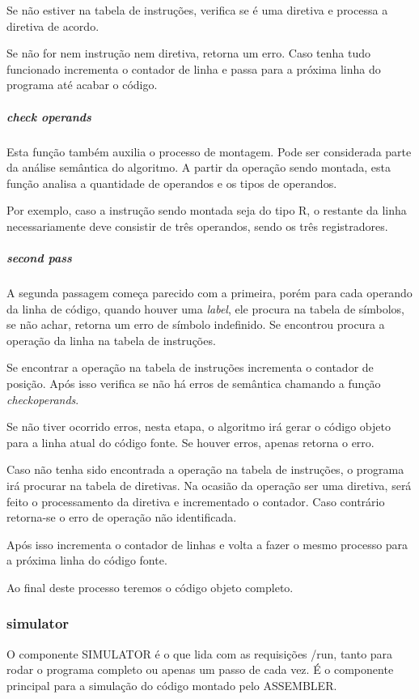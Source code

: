 				Se não estiver na tabela de instruções, verifica se é uma diretiva e processa a diretiva de acordo.

				Se não for nem instrução nem diretiva, retorna um erro. Caso tenha tudo funcionado incrementa o contador de linha e passa para a próxima linha do programa até acabar o código.

			\subparagraph{check operands}

				Esta função também auxilia o processo de montagem. Pode ser considerada parte da análise semântica do algoritmo. A partir da operação sendo montada, esta função analisa a quantidade de operandos e os tipos de operandos. 

				Por exemplo, caso a instrução sendo montada seja do tipo R, o restante da linha necessariamente deve consistir de três operandos, sendo os três registradores. 

			\subparagraph{second pass}
			
				A segunda passagem começa parecido com a primeira, porém para cada operando da linha de código, quando houver uma \textit{label}, ele procura na tabela de símbolos, se não achar, retorna um erro de símbolo indefinido. Se encontrou procura a operação da linha na tabela de instruções.

				Se encontrar a operação na tabela de instruções incrementa o contador de posição. Após isso verifica se não há erros de semântica chamando a função \textit{check\textunderscore operands}.

				Se não tiver ocorrido erros, nesta etapa, o algoritmo irá gerar o código objeto para a linha atual do código fonte. Se houver erros, apenas retorna o erro.

				Caso não tenha sido encontrada a operação na tabela de instruções, o programa irá procurar na tabela de diretivas. Na ocasião da operação ser uma diretiva, será feito o processamento da diretiva e incrementado o contador. Caso contrário retorna-se o erro de operação não identificada.

				Após isso incrementa o contador de linhas e volta a fazer o mesmo processo para a próxima linha do código fonte.

				Ao final deste processo teremos o código objeto completo.
			
		\subsubsection{simulator}

			O componente SIMULATOR é o que lida com as requisições /run, tanto para rodar o programa completo ou apenas um passo de cada vez. É o componente principal para a simulação do código montado pelo ASSEMBLER.

